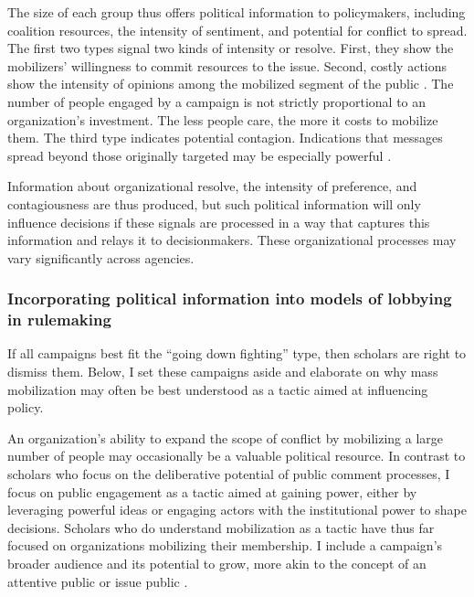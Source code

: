The size of each group thus offers political information to policymakers, including coalition resources, the intensity of sentiment, and potential for conflict to spread. The first two types signal two kinds of intensity or resolve. First, they show the mobilizers' willingness to commit resources to the issue. Second, costly actions show the intensity of opinions among the mobilized segment of the public \citep{Dunleavy1991}. The number of people engaged by a campaign is not strictly proportional to an organization's investment. The less people care, the more it costs to mobilize them. The third type indicates potential contagion. Indications that messages spread beyond those originally targeted may be especially powerful \citep{Kollman1998}. 

Information about organizational resolve, the intensity of preference, and contagiousness are thus produced, but %
such political information will only influence decisions if these signals are processed in a way that captures this information and relays it to decisionmakers. These organizational processes may vary significantly across agencies.


\subsubsection{Incorporating political information into models of lobbying in rulemaking}
If all campaigns best fit the ``going down fighting'' type, then scholars are right to dismiss them. Below, I set these campaigns aside and elaborate on why mass mobilization may often be best understood as a tactic aimed at influencing policy.

An organization's ability to expand the scope of conflict by mobilizing a large number of people may occasionally be a valuable political resource. 
In contrast to scholars who focus on the deliberative potential of public comment processes, I focus on public engagement as a tactic aimed at gaining power, either by leveraging powerful ideas or engaging actors with the institutional power to shape decisions.
Scholars who do understand mobilization as a tactic \citep{Furlong1997, Kerwin2011} have thus far focused on organizations mobilizing their membership. %
I include a campaign's broader audience and its potential to grow, more akin to the concept of an attentive public \citep{Key1961} or issue public \citep{Converse1964}.

